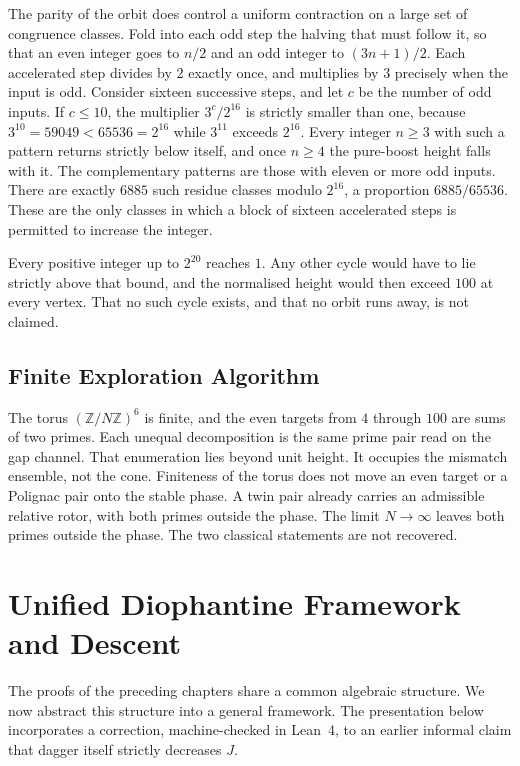\documentclass[a4paper]{article}
\theoremstyle{definition}
\theoremstyle{remark}
\begin{document}
The parity of the orbit does control a uniform contraction on a large set of congruence classes. Fold into each odd step the halving that must follow it, so that an even integer goes to \(n/2\) and an odd integer to \((3n+1)/2\). Each accelerated step divides by \(2\) exactly once, and multiplies by \(3\) precisely when the input is odd. Consider sixteen successive steps, and let \(c\) be the number of odd inputs. If \(c\le 10\), the multiplier \(3^c/2^{16}\) is strictly smaller than one, because \(3^{10}=59049<65536=2^{16}\) while \(3^{11}\) exceeds \(2^{16}\). Every integer \(n\ge 3\) with such a pattern returns strictly below itself, and once \(n\ge 4\) the pure-boost height falls with it. The complementary patterns are those with eleven or more odd inputs. There are exactly \(6885\) such residue classes modulo \(2^{16}\), a proportion \(6885/65536\). These are the only classes in which a block of sixteen accelerated steps is permitted to increase the integer.

Every positive integer up to \(2^{20}\) reaches \(1\). Any other cycle would have to lie strictly above that bound, and the normalised height would then exceed \(100\) at every vertex. That no such cycle exists, and that no orbit runs away, is not claimed.

\subsection{Finite Exploration Algorithm}

The torus \( (\mathbb{Z}/N\mathbb{Z})^6 \) is finite, and the even targets from \(4\) through \(100\) are sums of two primes. Each unequal decomposition is the same prime pair read on the gap channel. That enumeration lies beyond unit height. It occupies the mismatch ensemble, not the cone. Finiteness of the torus does not move an even target or a Polignac pair onto the stable phase. A twin pair already carries an admissible relative rotor, with both primes outside the phase. The limit \(N\to\infty\) leaves both primes outside the phase. The two classical statements are not recovered.

\section{Unified Diophantine Framework and Descent}

The proofs of the preceding chapters share a common algebraic structure. We now abstract this structure into a general framework. The presentation below incorporates a correction, machine-checked in Lean~4, to an earlier informal claim that dagger itself strictly decreases \(J\).
\end{document}
